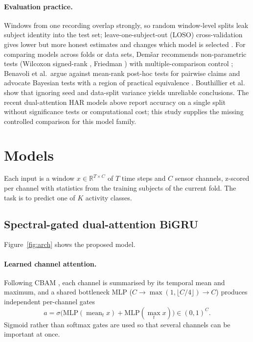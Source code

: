 \documentclass[11pt,a4paper]{article}
\begin{document}
\paragraph{Evaluation practice.}
Windows from one recording overlap strongly, so random window-level splits leak subject identity into the test set; leave-one-subject-out (LOSO) cross-validation gives lower but more honest estimates and changes which model is selected \cite{gholamiangonabadi2020deep,jordao2018human,hammerla2016deep}. For comparing models across folds or data sets, Dem\v{s}ar \cite{demsar2006statistical} recommends non-parametric tests (Wilcoxon signed-rank \cite{wilcoxon1945individual}, Friedman \cite{friedman1937use}) with multiple-comparison control \cite{holm1979simple}; Benavoli et al.\ argue against mean-rank post-hoc tests for pairwise claims \cite{benavoli2016should} and advocate Bayesian tests with a region of practical equivalence \cite{benavoli2017time}. Bouthillier et al.\ \cite{bouthillier2021accounting} show that ignoring seed and data-split variance yields unreliable conclusions. The recent dual-attention HAR models above report accuracy on a single split without significance tests or computational cost; this study supplies the missing controlled comparison for this model family.

\section{Models}
\label{sec:method}

Each input is a window $x\in\mathbb{R}^{T\times C}$ of $T$ time steps and $C$ sensor channels, z-scored per channel with statistics from the training subjects of the current fold. The task is to predict one of $K$ activity classes.

\subsection{Spectral-gated dual-attention BiGRU}
Figure~\ref{fig:arch} shows the proposed model.

\paragraph{Learned channel attention.}
Following CBAM \cite{woo2018cbam}, each channel is summarised by its temporal mean and maximum, and a shared bottleneck MLP ($C\to\max(1,\lfloor C/4\rfloor)\to C$) produces independent per-channel gates
\begin{equation}
a = \sigma\big(\mathrm{MLP}(\operatorname{mean}_t x) + \mathrm{MLP}(\operatorname{max}_t x)\big)\in(0,1)^C .
\end{equation}
Sigmoid rather than softmax gates are used so that several channels can be important at once.
\end{document}
